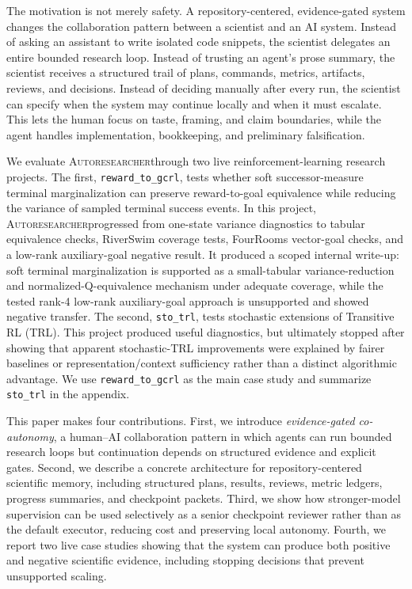 \documentclass{article}
\newcommand{\sys}{\textsc{Autoresearcher}}
\begin{document}
The motivation is not merely safety. A repository-centered, evidence-gated system changes the collaboration pattern between a scientist and an AI system. Instead of asking an assistant to write isolated code snippets, the scientist delegates an entire bounded research loop. Instead of trusting an agent's prose summary, the scientist receives a structured trail of plans, commands, metrics, artifacts, reviews, and decisions. Instead of deciding manually after every run, the scientist can specify when the system may continue locally and when it must escalate. This lets the human focus on taste, framing, and claim boundaries, while the agent handles implementation, bookkeeping, and preliminary falsification.

We evaluate \sys through two live reinforcement-learning research projects. The first, \texttt{reward\_to\_gcrl}, tests whether soft successor-measure terminal marginalization can preserve reward-to-goal equivalence while reducing the variance of sampled terminal success events. In this project, \sys progressed from one-state variance diagnostics to tabular equivalence checks, RiverSwim coverage tests, FourRooms vector-goal checks, and a low-rank auxiliary-goal negative result. It produced a scoped internal write-up: soft terminal marginalization is supported as a small-tabular variance-reduction and normalized-Q-equivalence mechanism under adequate coverage, while the tested rank-4 low-rank auxiliary-goal approach is unsupported and showed negative transfer. The second, \texttt{sto\_trl}, tests stochastic extensions of Transitive RL (TRL). This project produced useful diagnostics, but ultimately stopped after showing that apparent stochastic-TRL improvements were explained by fairer baselines or representation/context sufficiency rather than a distinct algorithmic advantage. We use \texttt{reward\_to\_gcrl} as the main case study and summarize \texttt{sto\_trl} in the appendix.

This paper makes four contributions. First, we introduce \emph{evidence-gated co-autonomy}, a human--AI collaboration pattern in which agents can run bounded research loops but continuation depends on structured evidence and explicit gates. Second, we describe a concrete architecture for repository-centered scientific memory, including structured plans, results, reviews, metric ledgers, progress summaries, and checkpoint packets. Third, we show how stronger-model supervision can be used selectively as a senior checkpoint reviewer rather than as the default executor, reducing cost and preserving local autonomy. Fourth, we report two live case studies showing that the system can produce both positive and negative scientific evidence, including stopping decisions that prevent unsupported scaling.
\end{document}
